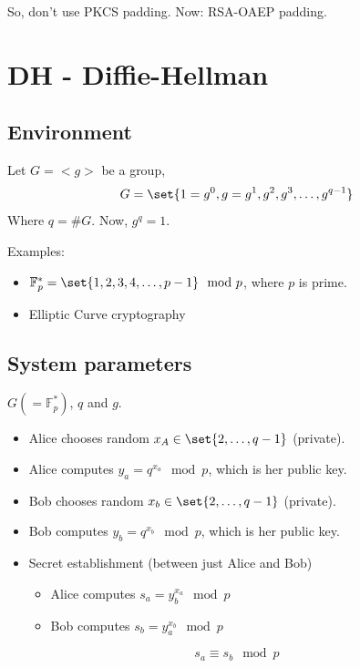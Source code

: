 \documentclass[language=english,number=]{homework}
\begin{document}
    So, don't use PKCS padding.
    Now: RSA-OAEP padding.

    \newpage
    \section{DH - Diffie-Hellman}

    \subsection{Environment}

    Let $G = <g>$ be a group,
    \[
        G = \set{1 = g^0, g=g^1, g^2, g^3, \dots, g^{q-1}}
    \]
    Where $q = \# G$.
    Now, $g^q = 1$.

    Examples:
    \begin{itemize}
        \item $\mathbb{F}_p^* = \set{1,2,3,4,\dots,p-1} \mod p$, where $p$ is prime.
        \item Elliptic Curve cryptography
    \end{itemize}

    \subsection{System parameters}

    $G ( = \mathbb{F}_p^*)$, $q$ and $g$.

    \begin{itemize}
        \item Alice chooses random $x_A \in \set{2,\dots,q-1}$ (private).
        \item Alice computes $y_a = q^{x_a} \mod p$, which is her public key.
        \item Bob chooses random $ x_b \in \set{2,\dots,q-1}$ (private).
        \item Bob computes $y_b = q^{x_b} \mod p$, which is her public key.
        \item Secret establishment (between just Alice and Bob)
        \begin{itemize}
            \item Alice computes $s_a = y_b^{x_a} \mod p$
            \item Bob computes $s_b = y_a^{x_b} \mod p$
        \end{itemize}
    \end{itemize}

    \begin{theorem}
        \[
            s_a \equiv s_b \mod p
        \]
    \end{theorem}
\end{document}

